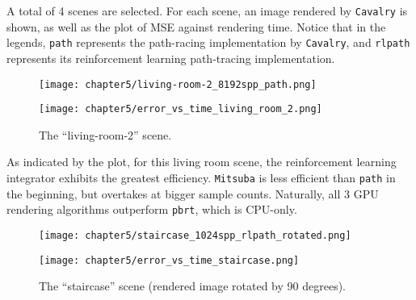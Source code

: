 A total of 4 scenes are selected. For each scene, an image rendered by \texttt{Cavalry} is shown, as well as the plot of MSE against rendering time. Notice that in the legends, \texttt{path} represents the path-racing implementation by \texttt{Cavalry}, and \texttt{rlpath} represents its reinforcement learning path-tracing implementation.

\thispagestyle{empty}
\enlargethispage{5\baselineskip}

\begin{figure}[H]
    \centering
    
    \begin{minipage}[t]{.99\textwidth}
        \centering
        \vspace{0pt}
        \texttt{[image: chapter5/living-room-2\_8192spp\_path.png]}
    \end{minipage}
    
    \vspace{0.1cm}

    \begin{minipage}[t]{.99\textwidth}
        \centering
        \vspace{0pt}
        \texttt{[image: chapter5/error\_vs\_time\_living\_room\_2.png]}
    \end{minipage}
    
    \caption{The ``living-room-2'' scene.}
\end{figure}

As indicated by the plot, for this living room scene, the reinforcement learning integrator exhibits the greatest efficiency. \texttt{Mitsuba} is less efficient than \texttt{path} in the beginning, but overtakes at bigger sample counts. Naturally, all 3 GPU rendering algorithms outperform \texttt{pbrt}, which is CPU-only.

\newpage

\begin{figure}[H]
    \centering
    
    \begin{minipage}[t]{.99\textwidth}
        \centering
        \vspace{0pt}
        \texttt{[image: chapter5/staircase\_1024spp\_rlpath\_rotated.png]}
    \end{minipage}
    
    \vspace{0.3cm}

    \begin{minipage}[t]{.99\textwidth}
        \centering
        \vspace{0pt}
        \texttt{[image: chapter5/error\_vs\_time\_staircase.png]}
    \end{minipage}
    
    \caption{The ``staircase'' scene (rendered image rotated by 90 degrees).}
\end{figure}

